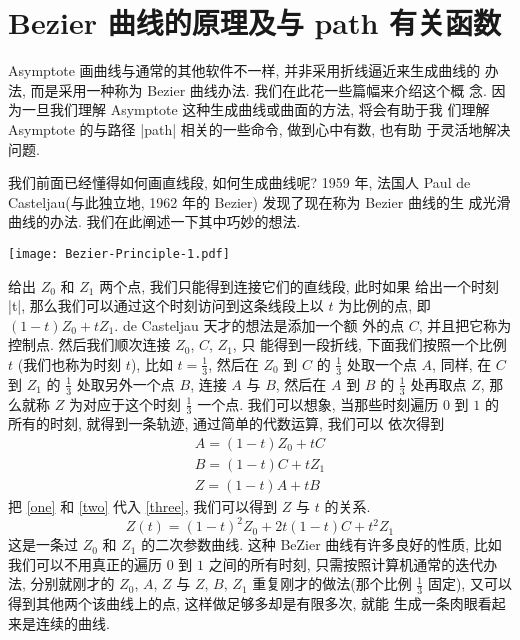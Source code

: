 \documentclass{ctexbook}
\begin{document}
\section{Bezier 曲线的原理及与 path 有关函数}
Asymptote 画曲线与通常的其他软件不一样, 并非采用折线逼近来生成曲线的
办法, 而是采用一种称为 Bezier 曲线办法. 我们在此花一些篇幅来介绍这个概
念. 因为一旦我们理解 Asymptote 这种生成曲线或曲面的方法, 将会有助于我
们理解 Asymptote 的与路径 |path| 相关的一些命令, 做到心中有数, 也有助
于灵活地解决问题. 

我们前面已经懂得如何画直线段, 如何生成曲线呢? 1959 年, 法国人 Paul de
Casteljau(与此独立地, 1962 年的 Bezier) 发现了现在称为 Bezier 曲线的生
成光滑曲线的办法. 我们在此阐述一下其中巧妙的想法.

\begin{center}\texttt{[image: Bezier-Principle-1.pdf]}\end{center}%


给出 $Z_{0}$ 和 $Z_{1}$ 两个点, 我们只能得到连接它们的直线段, 此时如果
给出一个时刻 |t|, 那么我们可以通过这个时刻访问到这条线段上以 $t$
为比例的点, 即 $(1-t)Z_{0}+t Z_{1}$. de Casteljau 天才的想法是添加一个额
外的点 $C$, 并且把它称为控制点. 然后我们顺次连接 $Z_{0}$, $C$, $Z_{1}$, 只
能得到一段折线, 下面我们按照一个比例 $t$ (我们也称为时刻 $t$), 比如
$t=\frac{1}{3}$, 然后在 $Z_{0}$ 到 $C$ 的 $\frac{1}{3}$ 处取一个点
$A$, 同样, 在 $C$ 到 $Z_{1}$ 的 $\frac{1}{3}$ 处取另外一个点 $B$, 连接 $A$
与 $B$, 然后在 $A$ 到 $B$ 的 $\frac{1}{3}$ 处再取点 $Z$, 那么就称 $Z$
为对应于这个时刻 $\frac{1}{3}$ 一个点. 我们可以想象, 当那些时刻遍历
$0$ 到 $1$ 的所有的时刻, 就得到一条轨迹, 通过简单的代数运算, 我们可以
依次得到
\begin{gather}
  A=(1-t)Z_{0}+tC \label{one}\\
  B=(1-t)C+tZ_{1}\label{two}\\
  Z=(1-t)A+tB\label{three}
\end{gather}
把 \eqref{one} 和 \eqref{two} 代入 \eqref{three}, 我们可以得到 $Z$ 与
$t$ 的关系.
\begin{displaymath}
  Z(t)=(1-t)^{2}Z_{0}+2t(1-t)C+t^{2}Z_{1}
\end{displaymath}
这是一条过 $Z_{0}$ 和 $Z_{1}$ 的二次参数曲线. 
这种 BeZier 曲线有许多良好的性质, 比如我们可以不用真正的遍历 $0$ 到
$1$ 之间的所有时刻, 只需按照计算机通常的迭代办法, 分别就刚才的
$Z_{0}$, $A$, $Z$ 与 $Z$, $B$, $Z_{1}$ 重复刚才的做法(那个比例 $\frac{1}{3}$
固定), 又可以得到其他两个该曲线上的点, 这样做足够多却是有限多次, 就能
生成一条肉眼看起来是连续的曲线. 
\end{document}
